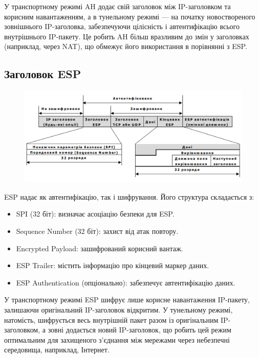 У транспортному режимі AH додає свій заголовок між IP-заголовком та корисним навантаженням, а в тунельному режимі — на початку новоствореного зовнішнього IP-заголовка, забезпечуючи цілісність і автентифікацію всього внутрішнього IP-пакету. Це робить AH більш вразливим до змін у заголовках (наприклад, через NAT), що обмежує його використання в порівнянні з ESP.

\subsection{Заголовок ESP}

\begin{figure}[h!]
        \centering
        \includegraphics[scale=0.35]{IMAGES/ESP_protoc.png}
        \label{fig_pacman}
\end{figure}

ESP надає як автентифікацію, так і шифрування. Його структура складається з:

\begin{itemize}
    \item SPI (32 біт): визначає асоціацію безпеки для ESP.
    \item Sequence Number (32 біт): захист від атак повтору.
    \item Encrypted Payload: зашифрований корисний вантаж.
    \item ESP Trailer: містить інформацію про кінцевий маркер даних.
    \item ESP Authentication (опціонально): забезпечує автентифікацію даних.
\end{itemize}

У транспортному режимі ESP шифрує лише корисне навантаження IP-пакету, залишаючи оригінальний IP-заголовок відкритим. У тунельному режимі, натомість, шифрується весь внутрішній пакет разом із оригінальним IP-заголовком, а зовні додається новий IP-заголовок, що робить цей режим оптимальним для захищеного з’єднання між мережами через небезпечні середовища, наприклад, Інтернет.

